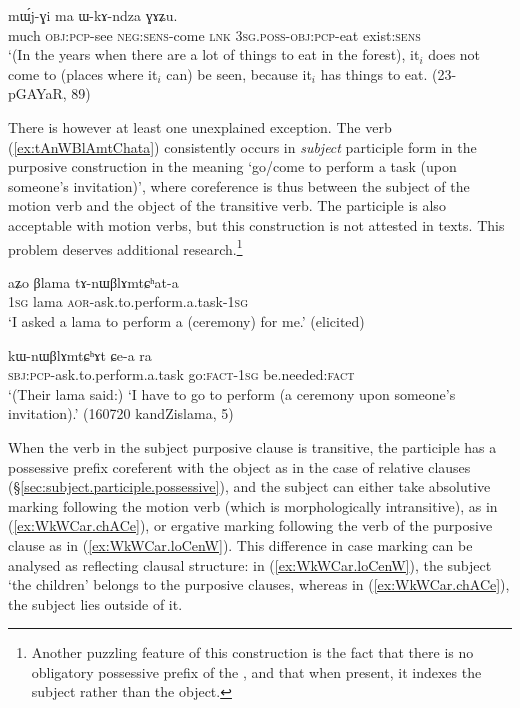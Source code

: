 \begin{exe}
	\ex \label{ex:kAmto.mWjGi}
	 mɯ́j-ɣi ma ɯ-kɤ-ndza ɣɤʑu. \\
	much \textsc{obj}:\textsc{pcp}-see \textsc{neg}:\textsc{sens}-come \textsc{lnk} \textsc{3sg}.\textsc{poss}-\textsc{obj}:\textsc{pcp}-eat exist:\textsc{sens} \\
	\glt `(In the years when there are a lot of things to eat in the forest), it$_i$ does not come to (places where it$_i$ can) be seen, because it$_i$ has things to eat. (23-pGAYaR, 89)
\end{exe}

There is however at least one unexplained exception. The verb  (\ref{ex:tAnWBlAmtChata}) consistently occurs in \textit{subject} participle form in the purposive construction in the meaning `go/come to perform a task (upon someone's invitation)', where coreference is thus between the subject of the motion verb and the object of the transitive verb. The  participle is also acceptable with motion verbs, but this construction is not attested in texts. This problem deserves additional research.\footnote{Another puzzling feature of this construction is the fact that there is no obligatory possessive prefix of the , and that when present, it indexes the subject rather than the object. 
}

\begin{exe}
	\ex \label{ex:tAnWBlAmtChata}
	\gll aʑo βlama  tɤ-nɯβlɤmtɕʰat-a \\
	\textsc{1sg} lama \textsc{aor}-ask.to.perform.a.task-\textsc{1sg} \\
	\glt `I asked a lama to perform a (ceremony) for me.' (elicited)
\end{exe}

\begin{exe}
	\ex \label{ex:kWnWBlAmtChAt.Cea}
	\gll kɯ-nɯβlɤmtɕʰɤt ɕe-a ra \\
	\textsc{sbj}:\textsc{pcp}-ask.to.perform.a.task go:\textsc{fact}-\textsc{1sg} be.needed:\textsc{fact} \\
	\glt `(Their lama said:) `I have to go to perform (a ceremony upon someone's invitation).' (160720 kandZislama, 5)
\end{exe}

When the verb in the subject purposive clause is transitive, the participle has a possessive prefix coreferent with the object as in the case of relative clauses (§\ref{sec:subject.participle.possessive}), and the subject can either take absolutive marking following the motion verb (which is morphologically intransitive), as in (\ref{ex:WkWCar.chACe}), or ergative marking following the verb of the purposive clause as in (\ref{ex:WkWCar.loCenW}). This difference in case marking can be analysed as reflecting clausal structure: in (\ref{ex:WkWCar.loCenW}), the subject  `the children' belongs to the purposive clauses, whereas in (\ref{ex:WkWCar.chACe}), the subject  lies outside of it.


